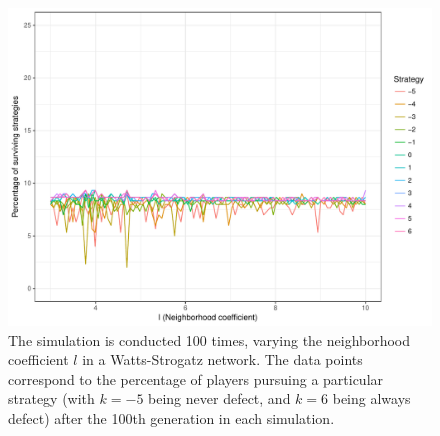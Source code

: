 \documentclass[12pt]{article}
\begin{document}
\begin{figure}
    \centering
    \includegraphics[width=\linewidth]{../figures/results_WS_300_nei_100sims.pdf}
    \caption{The simulation is conducted 100 times, varying the neighborhood coefficient $l$ in a Watts-Strogatz network. The data points correspond to the percentage of players pursuing a particular strategy (with $k=-5$ being never defect, and $k=6$ being always defect) after the 100th generation in each simulation.}
    \label{WS_300_l_100sims}
\end{figure}
\end{document}
